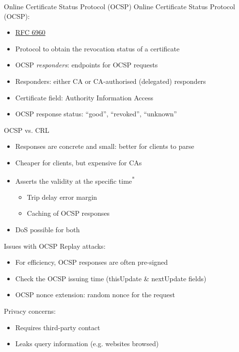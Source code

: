 \begin{frame}{Online Certificate Status Protocol (OCSP)}
  Online Certificate Status Protocol (OCSP):
  \begin{itemize}[<+(1)->]
    \item \href{https://datatracker.ietf.org/doc/html/rfc6960}{RFC 6960}
    \item Protocol to obtain the revocation status of a certificate
    \item OCSP \emph{responders}: endpoints for OCSP requests
    \item Responders: either CA or CA-authorised (delegated) responders
    \item Certificate field: Authority Information Access
    \item OCSP response status: \enquote{good}, \enquote{revoked}, \enquote{unknown}
  \end{itemize}
\end{frame}

\begin{frame}{OCSP vs. CRL}
  \begin{itemize}[<+(1)->]
    \item Responses are concrete and small: better for clients to parse
    \item Cheaper for clients, but expensive for CAs
    \item Asserts the validity at the specific time\textsuperscript{*}
    \begin{itemize}
      \item Trip delay error margin
      \item Caching of OCSP responses
    \end{itemize}
    \item DoS possible for both
  \end{itemize}
\end{frame}

\begin{frame}{Issues with OCSP}  
  \pause
  Replay attacks:
  \begin{itemize}[<+(1)->]
    \item For efficiency, OCSP responses are often pre-signed
    \item Check the OCSP issuing time (thisUpdate \& nextUpdate fields)
    \item OCSP nonce extension: random nonce for the request
  \end{itemize}

  \pause
  Privacy concerns:
  \begin{itemize}[<+(1)->]
    \item Requires third-party contact
    \item Leaks query information (e.g. websites browsed)
  \end{itemize}
\end{frame}

